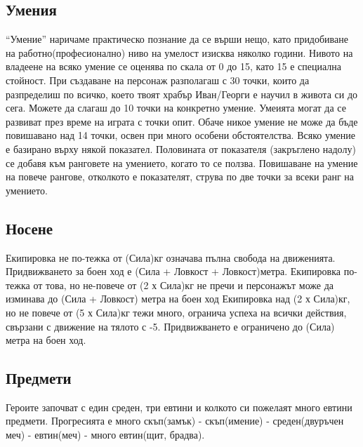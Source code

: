 \subsection{Умения}
“Умение” наричаме практическо познание да се върши нещо, като придобиване на работно(професионално) ниво на умелост изисква няколко години.
Нивото на владеене на всяко умение се оценява по скала от 0 до 15, като 15 е специална стойност.
При създаване на персонаж разполагаш с 30 точки, които да разпределиш по всичко, което твоят храбър Иван/Георги е научил в живота си до сега.
Можете да слагаш до 10 точки на конкретно умение.
Умеията могат да се развиват през време на играта с точки опит.
Обаче никое умение не може да бъде повишавано над 14 точки, освен при много особени обстоятелства.
Всяко умение е базирано върху някой показател.
Половината от показателя (закръглено надолу) се добавя към ранговете на умението, когато то се ползва.
Повишаване на умение на повече рангове,  отколкото е показателят, струва по две точки за всеки ранг на умението.

\subsection{Носене}
Екипировка не по-тежка от (Сила)кг означава пълна свобода на движенията.
Придвижването за боен ход е (Сила + Ловкост + Ловкост)метра.
Екипировка по-тежка от това, но не-повече от (2 х Сила)кг не пречи и персонажът може да изминава до (Сила + Ловкост) метра на боен ход
Екипировка над (2 х Сила)кг, но не повече от (5 х Сила)кг тежи много, огранича успеха на всички действия, свързани с движение на тялото с -5.
Придвижването е ограничено до (Сила) метра на боен ход.

\subsection{Предмети}
Героите започват с един среден, три евтини и колкото си пожелаят много евтини предмети.
Прогресията е много скъп(замък) - скъп(имение) - среден(двуръчен меч) - евтин(меч) - много евтин(щит, брадва).
